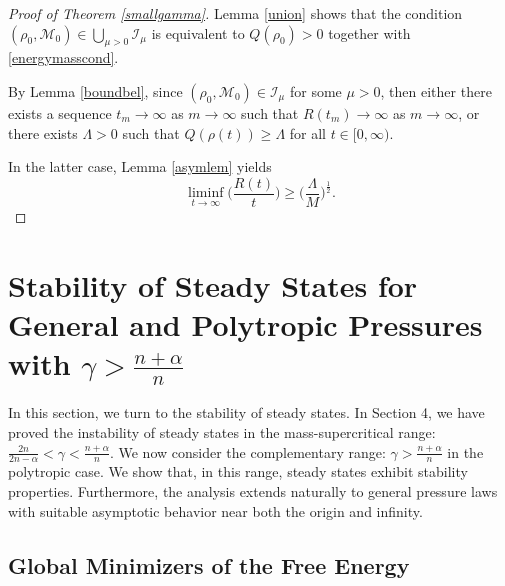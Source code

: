 \documentclass[reqno,11pt]{amsart}
\numberwithin{equation}{section}
\theoremstyle{definition}
\begin{document}
\begin{proof}[Proof of Theorem \ref{smallgamma}]
    Lemma \ref{union} shows that the condition $(\rho_0,\mathcal{M}_0) \in \bigcup_{\mu > 0} \mathcal{I}_\mu$ is equivalent to $Q(\rho_0) > 0$ together with \eqref{energymasscond}. 
    
    By Lemma \ref{boundbel}, since $(\rho_0,\mathcal{M}_0) \in \mathcal{I}_{\mu}$ 
    for some $\mu > 0$, then either there exists a sequence $t_m \to \infty$ as $m \to \infty$ such that $R(t_m) \to \infty$ as $m \to \infty$, 
    or there exists $\Lambda > 0$ such that $Q(\rho(t)) \geq \Lambda$ for all $t \in [0,\infty)$. 
   
    In the latter case, Lemma \ref{asymlem} yields
    \[
 \liminf_{t \to \infty} \Big ( \frac{R(t)}{t} \Big ) \geq \Big ( \frac{\Lambda}{M} \Big )^\frac{1}{2}.
    \]
\end{proof}

\setcounter{step}{0}
\setcounter{case}{0}


\section{Stability of Steady States for General and Polytropic Pressures with $\gamma > \frac{n + \alpha}{n}$} \label{stability}

In this section, we turn to the stability of steady states. 
In Section 4, we have proved the instability of steady states in the mass-supercritical range:
$\frac{2n}{2n-\alpha} < \gamma < \frac{n + \alpha}{n}$. 
We now consider the complementary range: $\gamma > \frac{n + \alpha}{n}$ in the polytropic case. 
We show that, in this range, steady states exhibit stability properties. 
Furthermore, the analysis extends naturally to general pressure laws 
with suitable asymptotic behavior near both the origin and infinity.

\subsection{Global Minimizers of the Free Energy}
\end{document}
